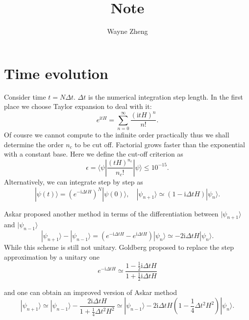 \documentclass[eprint]{article} %
\begin{document}
\title{Note}
\author{Wayne Zheng}


\maketitle

\section{Time evolution} 

Consider time $t=N\Delta{t}$. $\Delta{t}$ is the numerical integration step length. In the first place we choose Taylor expansion to deal with it:
\begin{equation}
    e^{\text{i}tH}=\sum_{n=0}^{\infty}\frac{(\text{i}tH)^{n}}{n!}.
\end{equation}
Of cousre we cannot compute to the infinite order practically thus we shall determine the order $n_{c}$ to be cut off. Factorial grows faster than the exponential with a constant base. Here we define the cut-off criterion as
\begin{equation}
    \epsilon=\langle\psi|\frac{(tH)^{n_{c}}}{n_{c}!}|\psi\rangle\leq{10^{-15}}.
    \label{}
\end{equation}
Alternatively, we can integrate step by step as
\begin{equation}
    |\psi(t)\rangle=\left(e^{-\text{i}\Delta{t}H}\right)^{N}|\psi(0)\rangle,\quad |\psi_{n+1}\rangle\simeq(1-\text{i}\Delta{t}H)|\psi_{n}\rangle.
    \label{}
\end{equation}

Askar proposed another method in terms of the differentiation between $|\psi_{n+1}\rangle$ and $|\psi_{n-1}\rangle$
\begin{equation}
    |\psi_{n+1}\rangle-|\psi_{n-1}\rangle=\left(e^{-\text{i}\Delta{t}H}-e^{\text{i}\Delta{t}H}\right)|\psi_{n}\rangle\simeq-2\text{i}\Delta{t}H|\psi_{n}\rangle.
    \label{}
\end{equation}
While this scheme is still not unitary. Goldberg proposed to replace the step approximation by a unitary one
\begin{equation}
    e^{-\text{i}\Delta{t}H}\simeq\frac{1-\frac{1}{2}\text{i}\Delta{t}H}{1+\frac{1}{2}\text{i}\Delta{t}H}
    \label{}
\end{equation}

and one can obtain an improved version of Askar method
\begin{equation}
    |\psi_{n+1}\rangle\simeq|\psi_{n-1}\rangle-\frac{2\text{i}\Delta{t}H}{1+\frac{1}{4}\Delta{t}^{2}H^{2}}\simeq|\psi_{n-1}\rangle-2\text{i}\Delta{t}H\left(1-\frac{1}{4}\Delta{t}^{2}H^{2}\right)|\psi_{n}\rangle.
    \label{}
\end{equation}

 

\end{document}
